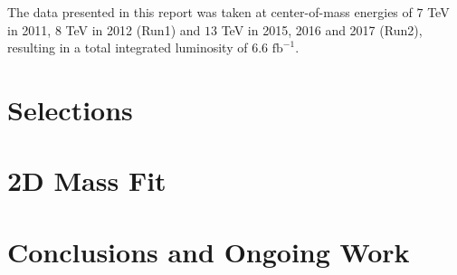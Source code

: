 \documentclass[oneside,12pt]{article}
\begin{document}
The data presented in this report was taken at center-of-mass energies of $7$
TeV in 2011, $8$ TeV in 2012 (Run1) and $13$ TeV in 2015, 2016 and 2017 (Run2),
resulting in a total integrated luminosity of $6.6$ $\text{fb}^{-1}$.

\section{Selections} \label{selections}
\section{2D Mass Fit} \label{massfit}
\section{Conclusions and Ongoing Work} \label{conclusion}

\printbibliography[heading=bibintoc,{title=References}]
\end{document}
